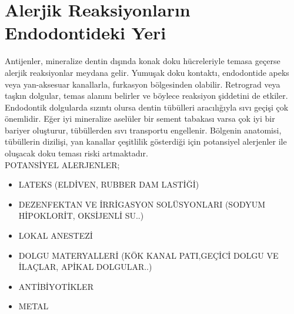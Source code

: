  
\section{Alerjik Reaksiyonların Endodontideki Yeri}

Antijenler, mineralize dentin dışında konak doku hücreleriyle temasa geçerse alerjik reaksiyonlar meydana gelir. Yumuşak doku kontaktı, endodontide apeks veya yan-aksesuar kanallarla, furkasyon bölgesinden olabilir. Retrograd veya taşkın dolgular, temas alanını belirler ve böylece reaksiyon şiddetini de etkiler. Endodontik  dolgularda sızıntı olursa dentin tübülleri aracılığıyla sıvı geçişi çok önemlidir. Eğer iyi mineralize aselüler bir sement tabakası varsa çok iyi bir bariyer oluşturur, tübüllerden sıvı transportu engellenir.
Bölgenin anatomisi, tübüllerin dizilişi, yan kanallar  çeşitlilik gösterdiği için potansiyel alerjenler ile oluşacak doku teması riski artmaktadır.\\

POTANSİYEL ALERJENLER;
\begin{itemize}
   \item LATEKS (ELDİVEN, RUBBER DAM LASTİĞİ)
   \item DEZENFEKTAN VE İRRİGASYON SOLÜSYONLARI (SODYUM HİPOKLORİT, OKSİJENLİ SU..)
   \item LOKAL ANESTEZİ
   \item DOLGU MATERYALLERİ (KÖK KANAL PATI,GEÇİCİ DOLGU VE İLAÇLAR, APİKAL DOLGULAR..)
   \item ANTİBİYOTİKLER
   \item METAL
\end{itemize}



